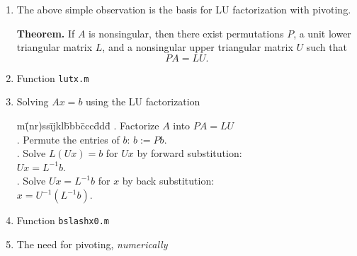 \documentclass[11pt]{article}
\begin{document}
\begin{enumerate}
\item The above simple
      observation is the basis for LU factorization with pivoting.  
 
{\bf Theorem.} 
If $A$ is nonsingular, then there exist permutations $P$, 
a unit lower triangular matrix $L$, and a nonsingular upper triangular 
matrix $U$ such that 
\[
P A = LU. 
\] 

\item Function {\tt lutx.m} %

\item Solving $Ax = b$ using the LU factorization 
\begin{tabbing}
m\= (nr)ss\=ijkl\=bbb\=ccc\=ddd\= \kill
.\> Factorize $A$ into $PA = LU$  \\
.\>  Permute the entries of $b$: $b := P b$.  \\
.\> Solve $L (Ux) = b$ for $Ux$ by forward substitution: \\
\>  \> \>    $Ux = L^{-1} b$.  \\
.\>  Solve $Ux = L^{-1} b$ for $x$ by back substitution: \\
\>  \> \>    $x = U^{-1}( L^{-1} b)$.
\end{tabbing}

\item Function {\tt bslashx0.m}

\item The need for pivoting, {\em numerically}


\end{enumerate}
\end{document}
